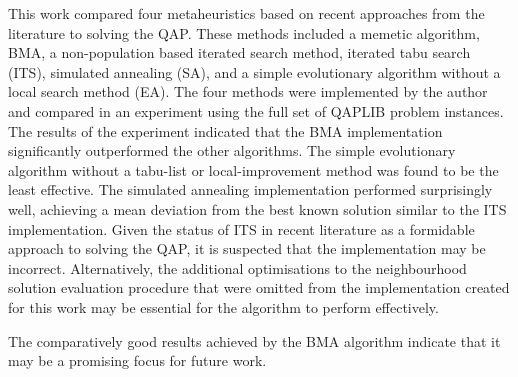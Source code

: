 This work compared four metaheuristics based on recent approaches from the literature to solving the QAP.
These methods included a memetic algorithm, BMA, a non-population based iterated search method, iterated tabu search (ITS), simulated annealing (SA), and a simple evolutionary algorithm without a local search method (EA).
The four methods were implemented by the author and compared in an experiment using the full set of QAPLIB problem instances.
The results of the experiment indicated that the BMA implementation significantly outperformed the other algorithms.
The simple evolutionary algorithm without a tabu-list or local-improvement method was found to be the least effective.
The simulated annealing implementation performed surprisingly well, achieving a mean deviation from the best known solution similar to the ITS implementation.
Given the status of ITS in recent literature as a formidable approach to solving the QAP, it is suspected that the implementation may be incorrect.
Alternatively, the additional optimisations to the neighbourhood solution evaluation procedure that were omitted from the implementation created for this work may be essential for the algorithm to perform effectively.

The comparatively good results achieved by the BMA algorithm indicate that it may be a promising focus for future work.
